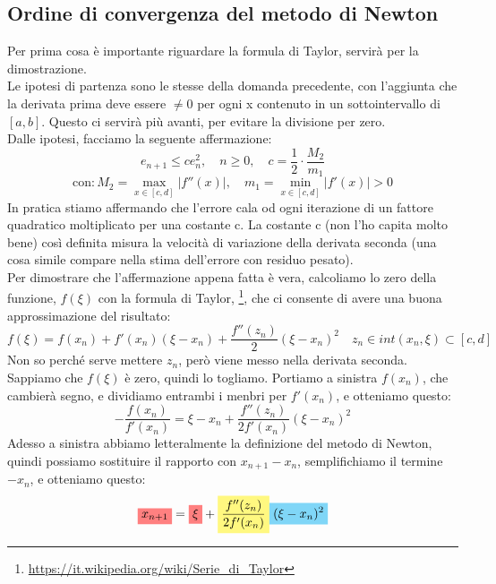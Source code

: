 \subsection{Ordine di convergenza del metodo di Newton}
Per prima cosa è importante riguardare la formula di Taylor, servirà per la dimostrazione.\\
Le ipotesi di partenza sono le stesse della domanda precedente, con l'aggiunta che la derivata prima deve essere $\neq 0$ per ogni x contenuto in un sottointervallo di $[a,b]$. Questo ci servirà più avanti, per evitare la divisione per zero.\\
Dalle ipotesi, facciamo la seguente affermazione:
\begin{displaymath}
    e_{n+1}\leq c e^2_n, \quad n \geq 0, \quad c=\frac{1}{2}\cdot \frac{M_2}{m_1}
\end{displaymath}
\begin{displaymath}
    \text{con}: M_2=\max_{x \in [c,d]}|f''(x)|, \quad m_1=\min_{x \in [c,d]}|f'(x)|>0
\end{displaymath}
In pratica stiamo affermando che l'errore cala od ogni iterazione di un fattore quadratico moltiplicato per una costante c. La costante c (non l'ho capita molto bene) così definita misura la velocità di variazione della derivata seconda (una cosa simile compare nella stima dell'errore con residuo pesato).\\
Per dimostrare che l'affermazione appena fatta è vera, calcoliamo lo zero della funzione, $f(\xi)$ con la formula di Taylor, \footnote[2]{\url{https://it.wikipedia.org/wiki/Serie_di_Taylor}}, che ci consente di avere una buona approssimazione del risultato:
\begin{displaymath}
    f(\xi)=f(x_n)+f'(x_n)(\xi - x_n)+\frac{f''(z_n)}{2}(\xi - x_n)^2 \quad z_n \in int(x_n,\xi) \subset [c,d]
\end{displaymath}
Non so perché serve mettere $z_n$, però viene messo nella derivata seconda.\\
Sappiamo che $f(\xi)$ è zero, quindi lo togliamo. Portiamo a sinistra $f(x_n)$, che cambierà segno, e dividiamo entrambi i menbri per $f'(x_n)$, e otteniamo questo:
\begin{displaymath}
    -\frac{f(x_n)}{f'(x_n)}=\xi - x_n + \frac{f''(z_n)}{2f'(x_n)}(\xi - x_n)^2
\end{displaymath}
Adesso a sinistra abbiamo letteralmente la definizione del metodo di Newton, quindi possiamo sostituire il rapporto con $x_{n+1}-x_n$, semplifichiamo il termine $-x_n$, e otteniamo questo:
\begin{displaymath}
    \highlightRED{x_{n+1}}=\highlightRED{\xi} + \highlightYELLOW{\frac{f''(z_n)}{2f'(x_n)}}\highlightCYAN{(\xi - x_n)^2}
\end{displaymath}
